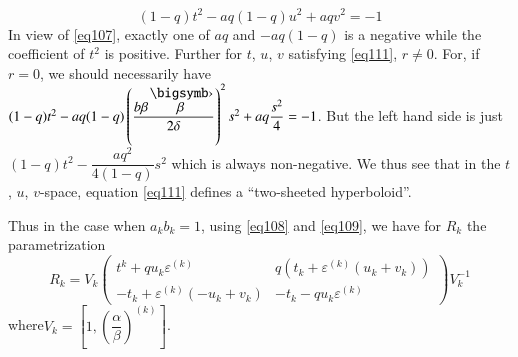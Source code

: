 \ie
\begin{equation*}
(1-q)t^{2}-aq(1-q)u^{2}+aqv^{2}=-1\tag{111}\label{eq111}
\end{equation*}
In view of \eqref{eq107}, exactly one of $aq$ and $-aq(1-q)$ is a
negative while the coefficient of $t^{2}$ is positive. Further for
$t$, $u$, $v$ satisfying \eqref{eq111}, $r\neq 0$. For, if $r=0$, we
should necessarily have
$(1-q)t^{2}-aq(1-q)\left(\dfrac{b\beta\overdot{\beta}}
{2\delta}\right)^{2}s^{2}+aq\dfrac{s^{2}}{4}=-1$. But
the left hand side is just $(1-q)t^{2}-\dfrac{aq^{2}}{4(1-q)}s^{2}$
which is always non-negative. We thus see that in the $t$, $u$,
$v$-space, equation \eqref{eq111} defines a ``two-sheeted
hyperboloid''. 

Thus in the case when $a_{k}b_{k}=1$, using \eqref{eq108} and
\eqref{eq109}, we have for $R_{k}$ the parametrization
\begin{equation*}
R_{k}=V_{k}
\begin{pmatrix}
t^{k}+qu_{k}\varepsilon^{(k)} & q(t_{k}+\varepsilon^{(k)}(u_{k}+v_{k}))\\
-t_{k}+\varepsilon^{(k)}(-u_{k}+v_{k}) & -t_{k}-qu_{k}\varepsilon^{(k)}
\end{pmatrix}
V^{-1}_{k}\tag{112}\label{eq112}
\end{equation*}
where\pageoriginale $V_{k}=[1,(\dfrac{\alpha}{\beta})^{(k)}]$.

